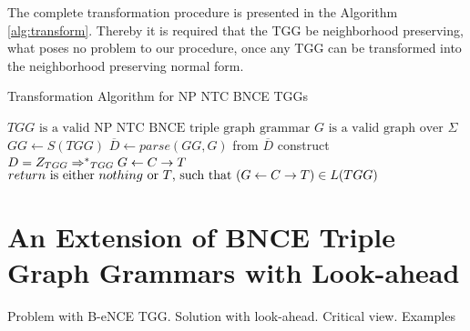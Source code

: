 \documentclass[]{report}
\begin{document}
The complete transformation procedure is presented in the Algorithm \ref{alg:transform}. Thereby it is required that the TGG be neighborhood preserving, what poses no problem to our procedure, once any TGG can be transformed into the neighborhood preserving normal form. 


\begin{algorithm}[!h]
	\caption{Transformation Algorithm for NP NTC BNCE TGGs}
	\begin{algorithmic}[!ht]
		\Require $TGG \text{ is a valid NP NTC BNCE triple graph grammar}$
		\Require $G \text{ is a valid graph over } \Sigma$
		\State $GG \gets S(TGG)$ 
		\State $\overline{D} \gets parse(GG,G)$ 
		 
		\State from $\overline{D}$ construct $D = \startTG{TGG} \derivtr{}{}{TGG} G \ms{} C \mt{} T$
		\State {}
		\Else
		\State {} 
		\EndIf
		\EndFunction 
		\Ensure $return \text{ is either } nothing \text{ or } T \text{, such that } (G \overset{}{\leftarrow} C \overset{}{\rightarrow} T) \in L(TGG)$
	\end{algorithmic}
	\label{alg:transform}
\end{algorithm}


\section{An Extension of BNCE Triple Graph Grammars with Look-ahead}
Problem with B-eNCE TGG. Solution with look-ahead. Critical view. Examples

\end{document}
